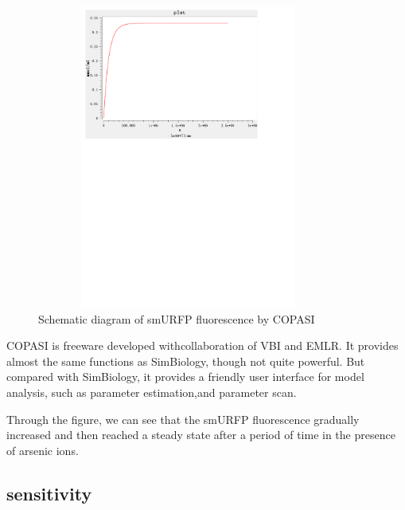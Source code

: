 \begin{figure}[h]
	\centering
	\includegraphics[width=10cm,height=10cm]{smuRFP}
	\caption{Schematic diagram of smURFP fluorescence by COPASI}
\end{figure}



COPASI is freeware developed withcollaboration of VBI and EMLR. It provides
almost the same functions as SimBiology, though not quite powerful. But compared with SimBiology, it provides a friendly user interface for model analysis, such as parameter estimation,and parameter scan.

Through the figure, we can see that the smURFP fluorescence gradually increased and then reached a steady state after a period of time  in the presence of arsenic ions.

\subsection{sensitivity }
